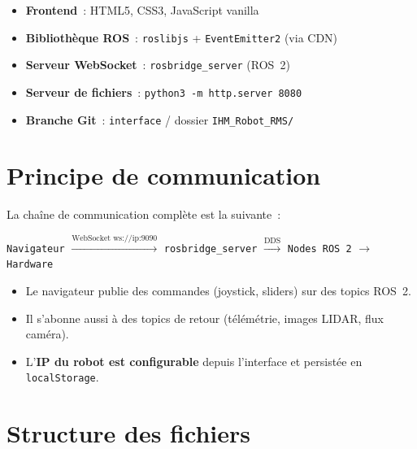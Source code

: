 \documentclass[12pt,a4paper]{report}
\begin{document}
\begin{infobox}
\begin{itemize}
  \item \textbf{Frontend}~: HTML5, CSS3, JavaScript vanilla
  \item \textbf{Bibliothèque ROS}~: \texttt{roslibjs} + \texttt{EventEmitter2} (via CDN)
  \item \textbf{Serveur WebSocket}~: \texttt{rosbridge\_server} (ROS~2)
  \item \textbf{Serveur de fichiers}~: \texttt{python3 -m http.server 8080}
  \item \textbf{Branche Git}~: \texttt{interface} / dossier \texttt{IHM\_Robot\_RMS/}
\end{itemize}
\end{infobox}

\section{Principe de communication}

La chaîne de communication complète est la suivante~:

\begin{center}
\texttt{Navigateur} $\xrightarrow{\text{WebSocket ws://ip:9090}}$ \texttt{rosbridge\_server} $\xrightarrow{\text{DDS}}$ \texttt{Nodes ROS~2} $\rightarrow$ \texttt{Hardware}
\end{center}

\begin{itemize}
  \item Le navigateur publie des commandes (joystick, sliders) sur des topics ROS~2.
  \item Il s'abonne aussi à des topics de retour (télémétrie, images LIDAR, flux caméra).
  \item L'\textbf{IP du robot est configurable} depuis l'interface et persistée en \texttt{localStorage}.
\end{itemize}

\section{Structure des fichiers}
\end{document}
